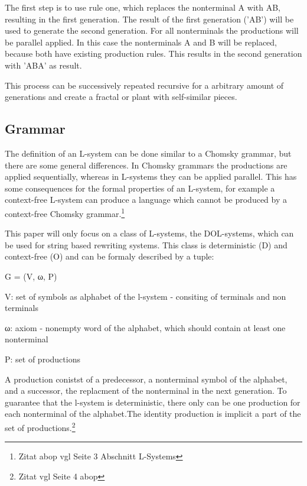 \documentclass[english]{cpp-hmwk}
\begin{document}
The first step is to use rule one, which replaces the nonterminal A with AB, resulting in the first generation. The result of the first generation ('AB') will be used to generate the second generation. For all nonterminals the productions will be parallel applied. In this case the nonterminals A and B will be replaced, because both have existing production rules. This results in the second generation with 'ABA' as result.

This process can be successively repeated recursive for a arbitrary amount of generations and create a fractal or plant with self-similar pieces.


\subsection{Grammar}
\label{section:grammar}
The definition of an L-system can be done similar to a Chomsky grammar, but there are some general differences. In Chomsky grammars the productions are applied sequentially, whereas in L-systems they can be applied parallel. This has some consequences for the formal properties of an L-system, for example a context-free L-system can produce a language which cannot be produced by a context-free Chomsky grammar.\footnote{Zitat abop vgl Seite 3  Abschnitt L-Systems}

\noindent This paper will only focus on a class of L-systems, the DOL-systems, which can be used for string based rewriting systems. This class is deterministic (D) and context-free (O) and can be formaly described  by a tuple:

\begin{center}
G = (V, ω, P)
\end{center}

V: set of symbols as alphabet of the l-system - consiting of terminals and non terminals

ω: axiom - nonempty word of the alphabet, which should contain at least one nonterminal

P: set of productions

\medskip
\noindent A production conistst of a predecessor, a nonterminal symbol of the alphabet, and a successor, the replacment of the nonterminal in the next generation.
To guarantee that the l-system is deterministic, there only can be one production for each nonterminal of the alphabet.The identity production is implicit a part of the set of productions.\footnote{Zitat vgl Seite 4 abop}

\bigskip
\end{document}
